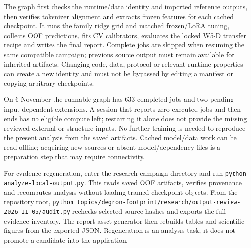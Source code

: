 The graph first checks the runtime/data identity and imported reference outputs, then verifies
tokenizer alignment and extracts frozen features for each cached checkpoint. It runs the family ridge
grid and matched frozen/LoRA tuning, collects OOF predictions, fits CV calibrators, evaluates the
locked W5-D transfer recipe and writes the final report. Complete jobs are skipped when resuming
the same compatible campaign; previous source output must remain available for inherited artifacts.
Changing code, data, protocol or relevant runtime properties can create a new identity and must not
be bypassed by editing a manifest or copying arbitrary checkpoints.

On 6 November the runnable graph has 633 completed jobs and two pending input-dependent
extensions. A session that reports zero executed jobs and then ends has no eligible compute left;
restarting it alone does not provide the missing reviewed external or structure inputs. No further
training is needed to reproduce the present analysis from the saved artifacts. Cached model/data
work can be read offline; acquiring new sources or absent model/dependency files is a preparation
step that may require connectivity.

For evidence regeneration, enter the research campaign directory and run
\nolinkurl{python analyze-local-output.py}. This reads saved OOF artifacts, verifies provenance and
recomputes analysis without loading trained checkpoint objects. From the repository root,
\nolinkurl{python topics/degron-footprint/research/output-review-2026-11-06/audit.py}
rechecks selected source hashes and exports the full evidence inventory. The report-asset generator
then rebuilds tables and scientific figures from the exported JSON. Regeneration is an analysis task;
it does not promote a candidate into the application.
